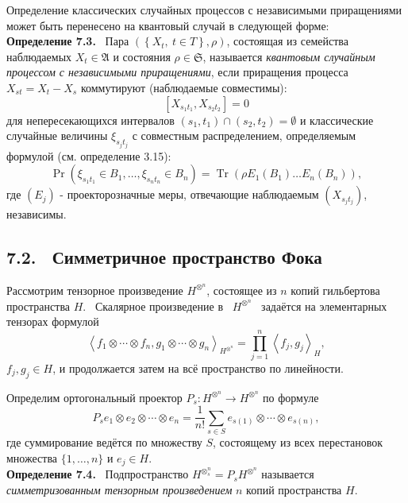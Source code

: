 \documentclass[a5paper, 16pt]{book}
\begin{document}
\newpage

Определение классических случайных процессов с независимыми приращениями может быть перенесено на квантовый случай в следующей форме:\\

\noindent\textbf{Определение 7.3.} \ Пара $\left(\left\{X_{t}, \ t \in T\right\}, \rho\right)$, состоящая из семейства наблюдаемых $X_{t} \in \mathfrak{A}$ и состояния $\rho \in \mathfrak{S}$, называется \textit{квантовым случайным процессом с независимыми приращениями}, если приращения процесса $X_{s t}=X_{t}-X_{s}$ коммутируют (наблюдаемые совместимы):
$$
\left[X_{s_{1} t_{1}}, X_{s_{2} t_{2}}\right]=0
$$ для непересекающихся интервалов $\left(s_{1}, t_{1}\right) \cap\left(s_{2}, t_{2}\right)=\emptyset$ и классические случайные величины $\xi_{s_{j} t_{j}}$ с совместным распределением, определяемым формулой (см. определение 3.15):
$$
\operatorname{Pr}\left(\xi_{s_{1} t_{1}} \in B_{1}, \ldots, \xi_{s_{n} t_{n}} \in B_{n}\right)=\operatorname{Tr}\left(\rho E_{1}\left(B_{1}\right) \ldots E_{n}\left(B_{n}\right)\right),
$$ где $\left(E_{j}\right)$ - проекторозначные меры, отвечающие наблюдаемым $\left(X_{s_{j} t_{j}}\right)$, независимы.

\subsection*{7.2. \ Симметричное пространство Фока}
Рассмотрим тензорное произведение $H^{\otimes^{n}}$, состоящее из $n$ копий гильбертова пространства $H$. \ Скалярное произведение в \ $H^{\otimes^{n}}$ \ задаётся на элементарных тензорах формулой
$$
\left\langle f_{1} \otimes \cdots \otimes f_{n}, g_{1} \otimes \cdots \otimes g_{n}\right\rangle_{H^{\otimes^{n}}}=\prod_{j=1}^{n}\left\langle f_{j}, g_{j}\right\rangle_{H},
$$
$f_{j}, g_{j} \in H$, и продолжается затем на всё пространство по линейности. 

Определим ортогональный проектор $P_{s}: H^{\otimes^{n}} \rightarrow H^{\otimes^{n}}$ по формуле
$$
P_{s} e_{1} \otimes e_{2} \otimes \cdots \otimes e_{n}=\frac{1}{n !} \sum_{s \in S} e_{s(1)} \otimes \cdots \otimes e_{s(n)},
$$
где суммирование ведётся по множеству $S$, состоящему из всех перестановок множества $\{1, \ldots, n\}$ и $e_{j} \in H$.\\

\noindent\textbf{Определение 7.4.} \ Подпространство $H^{\otimes_{s}^{n}}=P_{s} H^{\otimes^{n}}$ называется \textit{симметризованным тензорным произведением} $n$ копий пространства $H$.\\
\end{document}
